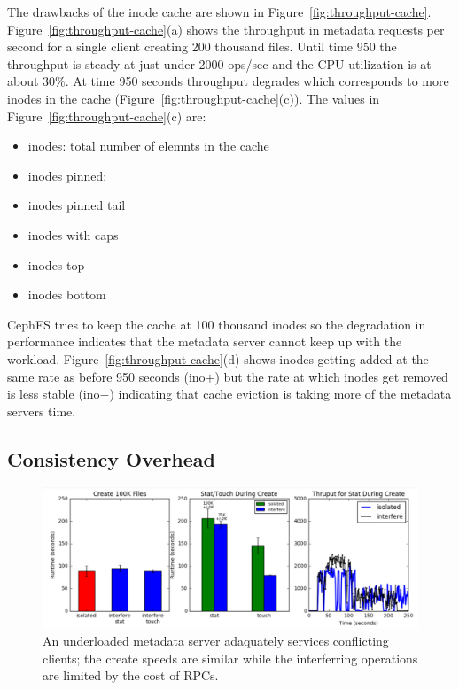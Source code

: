 \documentclass[preprint]{sigplanconf-eurosys}
\begin{document}

The drawbacks of the inode cache are shown in
Figure~\ref{fig:throughput-cache}.  Figure~\ref{fig:throughput-cache}(a) shows
the throughput in metadata requests per second for a single client creating 200
thousand files. Until time 950 the throughput is steady at just under 2000
ops/sec and the CPU utilization is at about 30\%. At time 950 seconds
throughput degrades which corresponds to more inodes in the cache
(Figure~\ref{fig:throughput-cache}(c)). The values in
Figure~\ref{fig:throughput-cache}(c) are:

\begin{itemize}
  \item inodes: total number of elemnts in the cache
  \item inodes pinned: 
  \item inodes pinned tail
  \item inodes with caps
  \item inodes top
  \item inodes bottom 
\end{itemize}

CephFS tries to keep the cache at 100 thousand inodes so the degradation in
performance indicates that the metadata server cannot keep up with the
workload. Figure~\ref{fig:throughput-cache}(d) shows inodes getting added at
the same rate as before 950 seconds (ino\(+\)) but the rate at which inodes get
removed is less stable (ino\(-\)) indicating that cache eviction is taking more
of the metadata servers time.

\subsection{Consistency Overhead}
\begin{figure}[tb]
\centering
\includegraphics[width=180mm]{figures/exp0-underloaded.png}
\caption{An underloaded metadata server adaquately services conflicting
clients; the create speeds are similar while the interferring operations are
limited by the cost of RPCs.}\label{fig:exp0-underloaded}
\end{figure}
\end{document}
